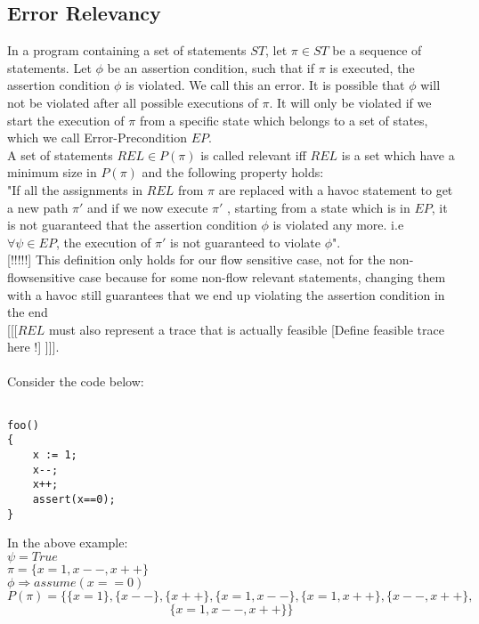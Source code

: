 \documentclass{article}
\begin{document}
\subsection{Error Relevancy}
In a program containing a set of statements $ST$, let $\pi \in ST$ be a sequence of statements. Let $\phi$ be an assertion condition, such that if $\pi$ is executed, the assertion condition $\phi$ is violated. We call this an error. It is possible that $\phi$ will not be violated after all possible executions of $\pi$. It will only be violated if we start the execution of $\pi$ from a specific state which belongs to a set of states, which we call Error-Precondition $EP$.\\
A set of statements $REL \in {P}(\pi)$ is called relevant iff $REL$ is a set which have a minimum size in ${P}(\pi)$ and the following property holds:
\\ "If all the assignments in $REL$ from $\pi$ are replaced with a havoc statement to get a new path $\pi'$ and if we now execute $\pi'$ , starting from a state which is in $EP$, it is not guaranteed that the assertion condition $\phi$ is violated any more. i.e $ \forall  \psi \in EP$, the execution of  $\pi'$  is not guaranteed to violate $\phi$". 
\\
{\tiny [!!!!!] This definition only holds for our flow sensitive case, not for the non-flowsensitive case because for some non-flow relevant statements, changing them with a havoc still guarantees that we end up violating the assertion condition in the end}
\\
{\tiny [[[$REL$ must also represent a trace that is actually feasible [Define feasible trace here !] ]]].}
\\
\\
Consider the code below:
\begin{lstlisting}

foo()
{
	x := 1;
	x--;
	x++;
	assert(x==0);
}

\end{lstlisting}
In the above example:\\
$\psi = True$            \\
$\pi = \{ x=1, x--, x++\} $\\    
$\phi \Rightarrow assume(x==0) $   
$${P}(\pi) =\{\{x=1\}, \{x--\},\{x++\}, \{x=1,x--\},\{x=1,x++\},\{x--,x++\},$$ $$\{x=1,x--,x++\}\}$$
\end{document}
